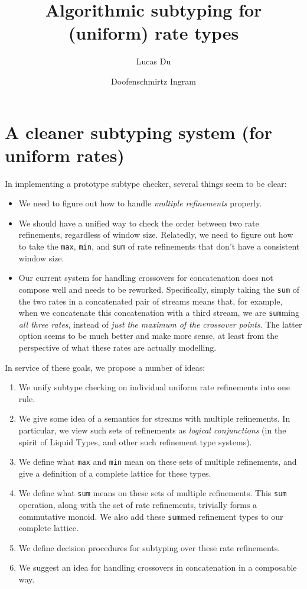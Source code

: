 \documentclass[acmsmall,nonacm,screen]{acmart}
\title{Algorithmic subtyping for (uniform) rate types}
\author{Lucas Du}
\affiliation{
  \institution{University of California, Davis}
  \country{USA}
}
\author{Doofenschmirtz Ingram}
\affiliation{
  \institution{The Couch, Catland}
  \country{USA}
}
\begin{document}
\maketitle

\section{A cleaner subtyping system (for uniform rates)}
In implementing a prototype subtype checker, several things seem to be clear:
\begin{itemize}
\item We need to figure out how to handle \textit{multiple refinements} properly.
\item We should have a unified way to check the order between two rate refinements, regardless of window size. Relatedly, we need to figure out how to take the \texttt{max}, \texttt{min}, and \texttt{sum} of rate refinements that don't have a consistent window size.
\item Our current system for handling crossovers for concatenation does not compose well and needs to be reworked. Specifically, simply taking the \texttt{sum} of the two rates in a concatenated pair of streams means that, for example, when we concatenate this concatenation with a third stream, we are \texttt{sum}ming \textit{all three rates}, instead of \textit{just the maximum of the crossover points}. The latter option seems to be much better and make more sense, at least from the perspective of what these rates are actually modelling.
\end{itemize}
In service of these goals, we propose a number of ideas:
\begin{enumerate}
\item We unify subtype checking on individual uniform rate refinements into one rule.
\item We give some idea of a semantics for streams with multiple refinements. In particular, we view such sets of refinements as \textit{logical conjunctions} (in the spirit of Liquid Types, and other such refinement type systems).
\item We define what \texttt{max} and \texttt{min} mean on these sets of multiple refinements, and give a definition of a complete lattice for these types.
\item We define what \texttt{sum} means on these sets of multiple refinements. This \texttt{sum} operation, along with the set of rate refinements, trivially forms a commutative monoid. We also add these \texttt{sum}med refinement types to our complete lattice.
\item We define decision procedures for subtyping over these rate refinements.
\item We suggest an idea for handling crossovers in concatenation in a composable way.
\end{enumerate}
\end{document}
